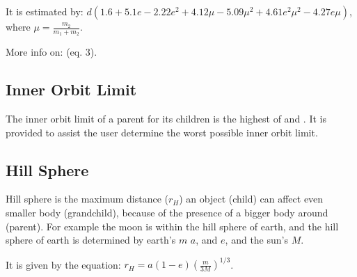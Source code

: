 \documentclass[letterpaper,10pt,english]{sphinxmanual}
\begin{document}
\sphinxAtStartPar
It is estimated by: \(d(1.6 + 5.1 e - 2.22 e^2 + 4.12 \mu - 5.09 \mu^2 + 4.61 e^2  \mu^2 - 4.27 e \mu)\),
where \(\mu = \frac{m_2}{m_1 + m_2}\).

\sphinxAtStartPar
More info on:  (eq. 3).


\subsection{Inner Orbit Limit}
\label{\detokenize{quantities/children_orbit_limits/inner_orbit_limit:inner-orbit-limit}}\label{\detokenize{quantities/children_orbit_limits/inner_orbit_limit::doc}}\label{\detokenize{quantities/children_orbit_limits/inner_orbit_limit:id1}}
\sphinxAtStartPar
The inner orbit limit of a parent for its children is the highest of
{\hyperref[\detokenize{quantities/children_orbit_limits/dense_roche_limit:id1}]{}} and {\hyperref[\detokenize{quantities/children_orbit_limits/p_type_critical_orbit:p-type-critical-orbit}]{}}.
It is provided to assist the user determine the worst possible inner orbit limit.


\subsection{Hill Sphere}
\label{\detokenize{quantities/children_orbit_limits/hill_sphere:hill-sphere}}\label{\detokenize{quantities/children_orbit_limits/hill_sphere::doc}}\label{\detokenize{quantities/children_orbit_limits/hill_sphere:id1}}
\sphinxAtStartPar
Hill sphere is the maximum distance (\(r_H\)) an object (child) can affect even smaller body (grandchild),
because of the presence of a bigger body around (parent).
For example the moon is within the hill sphere of earth, and the hill sphere of earth is determined
by earth’s {\hyperref[\detokenize{quantities/material/mass:id1}]{}} \(m\) {\hyperref[\detokenize{quantities/orbital/semi_major_axis:id1}]{}} \(a\),
and {\hyperref[\detokenize{quantities/orbital/eccentricity:id1}]{}} \(e\), and the sun’s {\hyperref[\detokenize{quantities/material/mass:id1}]{}} \(M\).

\sphinxAtStartPar
It is given by the equation: \(r_H = a (1 - e) \left(\frac{m}{3 M}\right)^{1/3}\).
\end{document}
